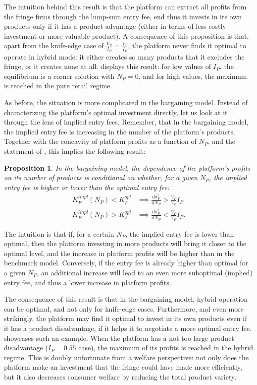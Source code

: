 \documentclass[a4paper]{article}
\newtheorem{proposition}{Proposition}
\newcommand{\dd}{\mathrm{d}}
\begin{document}
The intuition behind this result is that the platform can extract all profits from the fringe firms through the lump-sum entry fee, end thus it invests in its own products only if it has a product advantage (either in terms of less costly investment or more valuable product).
A consequence of this proposition is that, apart from the knife-edge case of $\frac{V_P}{I_P} = \frac{V_F}{I_F}$, the platform never finds it optimal to operate in hybrid mode: it either creates so many products that it excludes the fringe, or it creates none at all.
 displays this result: for low values of $I_P$, the equilibrium is a corner solution with $N_P = 0$, and for high values, the maximum is reached in the pure retail regime.

As before, the situation is more complicated in the bargaining model.
Instead of characterizing the platform's optimal investment directly, let us look at it through the lens of implied entry fees.
Remember, that in the bargaining model, the implied entry fee is increasing in the number of the platform's products.
Together with the concavity of platform profits as a function of $N_P$, and the statement of , this implies the following result:
\begin{proposition}
    \label{prop:comparative_n_p_bargaining}
    In the bargaining model, the dependence of the platform's profits on its number of products is conditional on whether, for a given $N_P$,  the implied entry fee is higher or lower than the optimal entry fee:
    \begin{align*}
        K_F^{impl}(N_P) < K_F^{opt} &\implies \frac{\dd \pi_P^t}{\dd N_P} > \frac{V_P}{V_F} I_F \\
        K_F^{impl}(N_P) > K_F^{opt} &\implies \frac{\dd \pi_P^t}{\dd N_P} < \frac{V_P}{V_F} I_F.
    \end{align*}
\end{proposition}
The intuition is that if, for a certain $N_P$, the implied entry fee is lower than optimal, then the platform investing in more products will bring it closer to the optimal level, and the increase in platform profits will be higher than in the benchmark model.
Conversely, if the entry fee is already higher than optimal for a given $N_P$, an additional increase will lead to an even more suboptimal (implied) entry fee, and thus a lower increase in platform profits.

The consequence of this result is that in the bargaining model, hybrid operation can be optimal, and not only for knife-edge cases.
Furthermore, and even more strikingly, the platform may find it optimal to invest in its own products even if it has a product disadvantage, if it helps it to negotiate a more optimal entry fee.
 showcases such an example.
When the platform has a not too large product disadvantage ($I_P = 0.55$ case), the maximum of its profits is reached in the hybrid regime.
This is doubly unfortunate from a welfare perspective: not only does the platform make an investment that the fringe could have made more efficiently, but it also decreases consumer welfare by reducing the total product variety.
\end{document}
